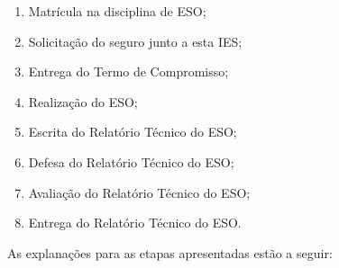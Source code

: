 \documentclass[
	12pt,				%
	openright,			%
  oneside,     %
	a4paper,			%
	english,			%
	french,				%
	spanish,			%
	brazil				%
	]{abntex2}
\begin{document}
\begin{enumerate}
    \item Matrícula na disciplina de ESO;
    \item Solicitação do seguro junto a esta IES;
    \item Entrega do Termo de Compromisso;
    \item Realização do ESO;
    \item Escrita do Relatório Técnico do ESO;
    \item Defesa do Relatório Técnico do ESO;
    \item Avaliação do Relatório Técnico do ESO;
    \item Entrega do Relatório Técnico do ESO.
\end{enumerate}

As explanações para as etapas apresentadas estão a seguir:
\end{document}
